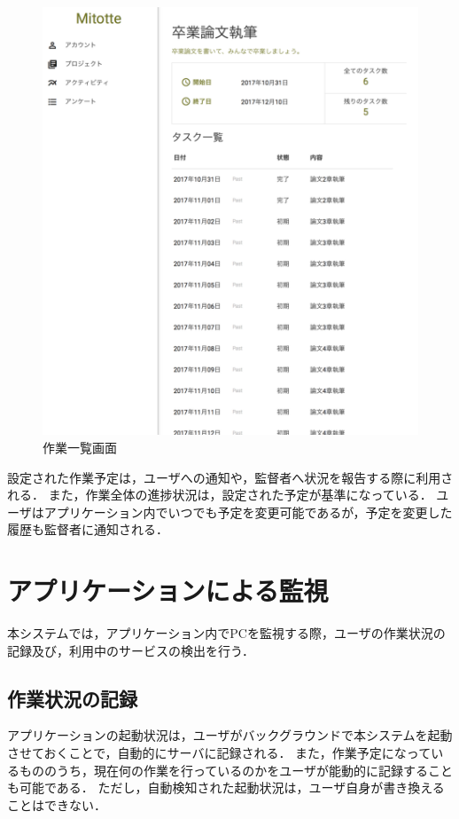 \begin{figure}[h]
  \begin{center}
  \includegraphics[width=12.0cm]{graphics/mitotte02.png}
  \caption{作業一覧画面}
  \end{center}
\end{figure}

設定された作業予定は，ユーザへの通知や，監督者へ状況を報告する際に利用される．
また，作業全体の進捗状況は，設定された予定が基準になっている．
ユーザはアプリケーション内でいつでも予定を変更可能であるが，予定を変更した履歴も監督者に通知される．

\section{アプリケーションによる監視}
本システムでは，アプリケーション内でPCを監視する際，ユーザの作業状況の記録及び，利用中のサービスの検出を行う．

\subsection{作業状況の記録}
アプリケーションの起動状況は，ユーザがバックグラウンドで本システムを起動させておくことで，自動的にサーバに記録される．
また，作業予定になっているもののうち，現在何の作業を行っているのかをユーザが能動的に記録することも可能である．
ただし，自動検知された起動状況は，ユーザ自身が書き換えることはできない．

